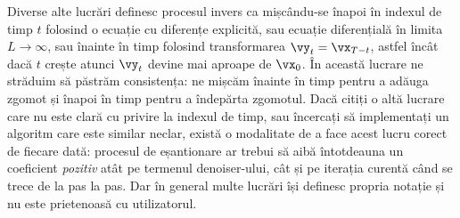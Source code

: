 \documentclass[../../book-main_ro.tex]{subfiles}
\begin{document}
\begin{remark}
	Diverse alte lucrări definesc procesul invers ca mișcându-se înapoi în indexul de timp \(t\) folosind o ecuație cu diferențe explicită, sau ecuație diferențială în limita \(L \to \infty\), sau înainte în timp folosind transformarea \(\vy_{t} = \vx_{T - t}\), astfel încât dacă \(t\) crește atunci \(\vy_{t}\) devine mai aproape de \(\vx_{0}\). În această lucrare ne străduim să păstrăm consistența: ne mișcăm înainte în timp pentru a adăuga zgomot și înapoi în timp pentru a îndepărta zgomotul. Dacă citiți o altă lucrare care nu este clară cu privire la indexul de timp, sau încercați să implementați un algoritm care este similar neclar, există o modalitate de a face acest lucru corect de fiecare dată: procesul de eșantionare ar trebui să aibă întotdeauna un coeficient \textit{pozitiv} atât pe termenul denoiser-ului, cât și pe iterația curentă când se trece de la pas la pas. Dar în general multe lucrări își definesc propria notație și nu este prietenoasă cu utilizatorul.
\end{remark}
\end{document}
